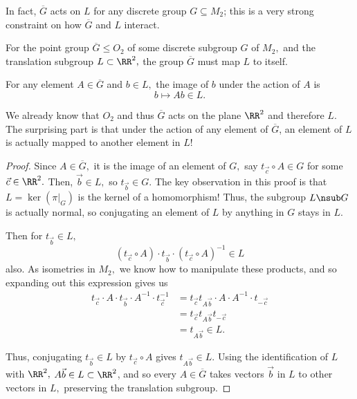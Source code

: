 In fact, $\overline{G}$ acts on $L$ for any discrete group $G \subseteq M_2$; this is a very strong constraint on how $\overline{G}$ and $L$ interact.

\begin{theorem}\label{point group acts on l}
For the point group $\overline{G}\leq O_2$ of some discrete subgroup $G$ of $M_2,$ and the translation subgroup $L \subset \RR^2,$ the group $\overline{G}$ must map $L$ to itself. 

For any element $A \in \overline{G}$ and $b \in L,$ the image of $b$ under the action of $A$ is
\[
b \mapsto Ab \in L.
\]



\end{theorem}

We already know that $O_2$ and thus $\overline{G}$ acts on the plane $\RR^2$ and therefore $L.$ The surprising part is that under the action of any element of $\overline{G}$, an element of $L$ is actually mapped to another element in $L$!


\begin{proof}
Since $A \in \overline{G},$ it is the image of an element of $G,$ say $t_{\vec{c}} \circ A \in G$ for some $\vec{c} \in \RR^2.$ Then, $\vec{b} \in L,$ so $t_{\vec{b}} \in G$. The key observation in this proof is that $L = \ker(\pi|_G)$ is the kernel of a homomorphism! Thus, the subgroup $L \nsub G$ is actually normal, so conjugating an element of $L$ by anything in $G$ stays in $L.$

Then for $t_{\vec{b}} \in L,$
\[
(t_{\vec{c}} \circ A) \cdot t_{\vec{b}} \cdot (t_{\vec{c}} \circ A)^{-1} \in L
\]
also. As isometries in $M_2,$ we know how to manipulate these products, and so expanding out this expression gives us 
\begin{align*}
    t_{\vec{c}} \cdot A \cdot t_{\vec{b}} \cdot A^{-1} \cdot t_{\vec{c}}^{-1} &= t_{\vec{c}} t_{A\vec{b}} \cdot A \cdot A^{-1} \cdot t_{-\vec{c}} \\
    &= t_{\vec{c}} t_{A\vec{b}} t_{-\vec{c}} \\
    &= t_{A\vec{b}} \in L.
\end{align*}

Thus, conjugating $t_{\vec{b}} \in L$ by $t_{\vec{c}} \circ A$ gives $t_{A\vec{b}} \in L.$ Using the identification of $L$ with $\RR^2,$ $A \vec{b} \in L \subset \RR^2$, and so every $A \in \overline{G}$ takes vectors $\vec{b}$ in $L$ to other vectors in $L,$ preserving the translation subgroup.
\end{proof}

